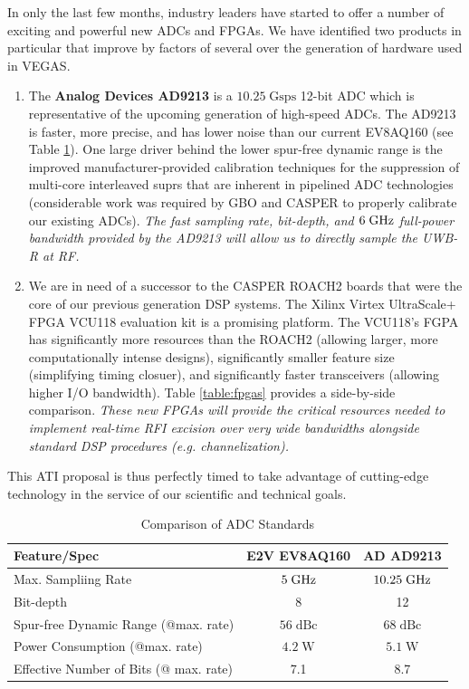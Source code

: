 \documentclass[10pt]{myNSF}
\begin{document}
 In only the last few months,
industry leaders have started to offer a number of exciting and
powerful new ADCs and FPGAs.  We have identified two products in
particular that improve by factors of several over the generation of
hardware used in VEGAS.
\begin{enumerate}
\item{The \textbf{Analog Devices AD9213} is a $10.25\; \mathrm{Gsps}$
    12-bit ADC which is representative of the upcoming generation of
    high-speed ADCs.  The AD9213 is faster, more precise, and has
    lower noise than our current EV8AQ160 (see Table
    \ref{table:adcs}).  One large driver behind the lower spur-free
    dynamic range is the improved manufacturer-provided calibration
    techniques for the suppression of multi-core interleaved suprs
    that are inherent in pipelined ADC technologies (considerable work
    was required by GBO and CASPER to properly calibrate our existing
    ADCs).  \emph{The fast sampling rate, bit-depth, and $6\; \textrm{GHz}$
      full-power bandwidth provided by the AD9213 will allow us to
      directly sample the UWB-R at RF.}}
\item{We are in need of a successor to the CASPER ROACH2 boards that
    were the core of our previous generation DSP systems.  The Xilinx
    Virtex UltraScale+ FPGA VCU118 evaluation kit is a promising
    platform.  The VCU118's FGPA has significantly more resources than
    the ROACH2 (allowing larger, more computationally intense
    designs), significantly smaller feature size (simplifying timing
    closuer), and significantly faster transceivers (allowing higher
    I/O bandwidth).  Table \ref{table:fpgas} provides a side-by-side
    comparison.  \emph{These new FPGAs will provide the critical
      resources needed to implement real-time RFI excision over very
      wide bandwidths alongside standard DSP procedures
      (e.g. channelization).}}
\end{enumerate}
This ATI proposal is thus perfectly timed to take advantage of
cutting-edge technology in the service of our scientific and technical
goals.

\begin{table}[h]
  \centering
  \caption{Comparison of ADC Standards \label{table:adcs}}
  \begin{tabular}{|l|c|c|}
    \hline
    Feature/Spec & E2V EV8AQ160 & AD AD9213 \\
    \hline
    Max. Sampliing Rate & $5\; \textrm{GHz}$ & $10.25\; \textrm{GHz}$ \\
    Bit-depth & 8 & 12 \\
    Spur-free Dynamic Range (@max. rate) & $56\; \mathrm{dBc}$ & $68\; \mathrm{dBc}$ \\
    Power Consumption (@max. rate) & $4.2\; \mathrm{W}$ & $5.1\; \mathrm{W}$ \\
    Effective Number of Bits (@ max. rate) & 7.1 & 8.7 \\
    \hline
  \end{tabular}
\end{table}
\end{document}
